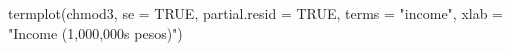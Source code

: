 \begin{Schunk}
\begin{Sinput}
 termplot(chmod3, se = TRUE, partial.resid = TRUE, terms = "income", xlab = "Income (1,000,000s pesos)")
\end{Sinput}
\end{Schunk}
